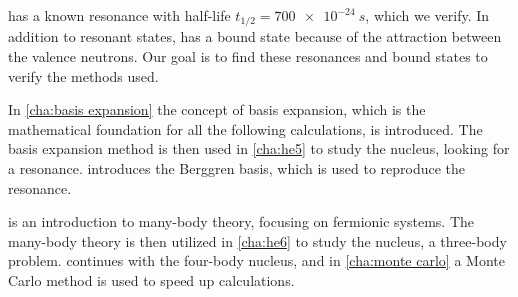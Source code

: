  has a known resonance with half-life $t_{1/2} = \SI{700e-24}{s}$,
which we verify. In addition to resonant states,  has a bound state because of the attraction between the valence neutrons. Our goal is to find these resonances and bound states to verify the methods used.




In \cref{cha:basis expansion} the concept of 
basis expansion, which is the mathematical foundation for all the
following calculations, is introduced. The basis expansion method is then used in 
\cref{cha:he5} to study the  nucleus, looking for a resonance.
 introduces the Berggren basis, which
is used to reproduce the resonance.


 is an introduction to many-body theory, focusing 
on fermionic systems. The many-body theory is then utilized in \cref{cha:he6} 
to study the  nucleus, a three-body problem. 
continues with the four-body  nucleus, and in \cref{cha:monte carlo}
a Monte Carlo method is used to speed up calculations.
